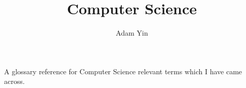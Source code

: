 \documentclass[a4paper]{article}
\title{Computer Science}
\author{Adam Yin}
\date{}
\begin{document}
\maketitle
A glossary reference for Computer Science relevant terms which I have
came across.
\cite{denotational_semantics_scott_strachey}

\clearpage

\glsaddall
{}
\printglossaries

\medskip



\end{document}
